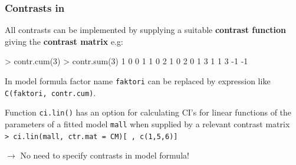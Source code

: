 \documentclass[12pt,dvipsnames,t,handout%
,aspectratio=169%
]{beamer}
\begin{document}
\begin{frame}[fragile]

\frametitle{Contrasts in \R}

\bi
\item
All contrasts can be implemented by supplying a suitable
{\bf contrast function} giving the {\bf contrast matrix} e.g:
{\small
\begin{semiverbatim}
{> contr.cum(3)}        {> contr.sum(3)}
1 0 0                  1    1   0    
2 1 0                  2    0   1   
3 1 1                  3   -1  -1   
\end{semiverbatim}
}
\medskip
\item
In model formula factor name {\tt faktori} can be replaced by expression
like \verb+C(faktori, contr.cum)+.
\medskip
\item 
Function \texttt{ci.lin()} has an option for calculating CI's for
linear functions of the parameters of a fitted
model {\tt mall} when supplied by a relevant contrast matrix \\
\verb|> ci.lin(mall, ctr.mat = CM)[ , c(1,5,6)]|

\medskip
$\to$ No need to specify contrasts in model formula!
\ei
\end{frame}
\end{document}
